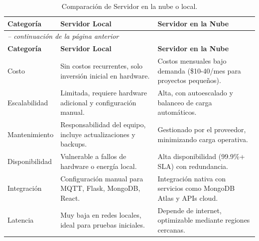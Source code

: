 \begin{longtable}{|p{2.6cm}|>{\RaggedRight}p{5.8cm}|>{\RaggedRight}p{5.8cm}|}
    \caption{Comparación de Servidor en la nube o local.} \label{tab:serlocal} \\
    \hline
    \textbf{Categoría} & \textbf{Servidor Local} \cite{zotero-item-250} & \textbf{Servidor en la Nube} \cite{2017} \\ \hline
    \endfirsthead
    
    \multicolumn{3}{l}{\footnotesize\itshape -- continuación de la página anterior} \\ \hline
    \textbf{Categoría} & \textbf{Servidor Local} & \textbf{Servidor en la Nube} \\ \hline
    \endhead

    Costo & Sin costos recurrentes, solo inversión inicial en hardware. & Costos mensuales bajo demanda (\$10-40/mes para proyectos pequeños). \\ \hline
    
    Escalabilidad & Limitada, requiere hardware adicional y configuración manual. & Alta, con autoescalado y balanceo de carga automáticos. \\ \hline
    
    Mantenimiento & Responsabilidad del equipo, incluye actualizaciones y backups. & Gestionado por el proveedor, minimizando carga operativa. \\ \hline
    
    Disponibilidad & Vulnerable a fallos de hardware o energía local. & Alta disponibilidad (99.9\%+ SLA) con redundancia. \\ \hline
    
    Integración & Configuración manual para MQTT, Flask, MongoDB, React. & Integración nativa con servicios como MongoDB Atlas y APIs cloud. \\ \hline
    
    Latencia & Muy baja en redes locales, ideal para pruebas iniciales. & Depende de internet, optimizable mediante regiones cercanas. \\ \hline
\end{longtable}
\endgroup


